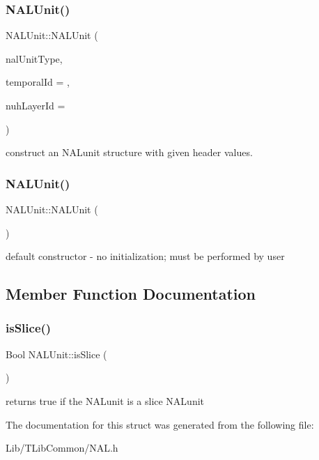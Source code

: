 \subsubsection{\texorpdfstring{N\+A\+L\+Unit()}{NALUnit()}\hspace{0.1cm}{\footnotesize\ttfamily [1/2]}}
{\footnotesize\ttfamily N\+A\+L\+Unit\+::\+N\+A\+L\+Unit (\begin{DoxyParamCaption}\item[{Nal\+Unit\+Type}]{nal\+Unit\+Type,  }\item[{Int}]{temporal\+Id = {},  }\item[{Int}]{nuh\+Layer\+Id = {} }\end{DoxyParamCaption})\hspace{0.3cm}{\ttfamily [inline]}}

construct an N\+A\+Lunit structure with given header values. \mbox{\label{struct_n_a_l_unit_a6733403da92fa97139104c47545c9ad7}} 
\subsubsection{\texorpdfstring{N\+A\+L\+Unit()}{NALUnit()}\hspace{0.1cm}{\footnotesize\ttfamily [2/2]}}
{\footnotesize\ttfamily N\+A\+L\+Unit\+::\+N\+A\+L\+Unit (\begin{DoxyParamCaption}{ }\end{DoxyParamCaption})\hspace{0.3cm}{\ttfamily [inline]}}

default constructor -\/ no initialization; must be performed by user 

\subsection{Member Function Documentation}
\mbox{\label{struct_n_a_l_unit_a94af464dfd41d51ff179026e02d9926b}} 
\subsubsection{\texorpdfstring{is\+Slice()}{isSlice()}}
{\footnotesize\ttfamily Bool N\+A\+L\+Unit\+::is\+Slice (\begin{DoxyParamCaption}{ }\end{DoxyParamCaption})\hspace{0.3cm}{\ttfamily [inline]}}

returns true if the N\+A\+Lunit is a slice N\+A\+Lunit 

The documentation for this struct was generated from the following file\+:\begin{DoxyCompactItemize}
\item 
Lib/\+T\+Lib\+Common/N\+A\+L.\+h\end{DoxyCompactItemize}
